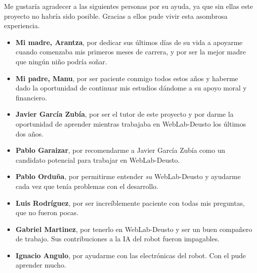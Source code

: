 Me gustaría agradecer a las siguientes personas por su ayuda, ya que sin ellas este proyecto no
habría sido posible. Gracias a ellos pude vivir esta asombrosa experiencia.

\begin{itemize}
	\item \textbf{Mi madre, Arantza}, por dedicar sus últimos días de su vida a apoyarme cuando
	comenzaba mis primeros meses de carrera, y por ser la mejor madre que ningún niño podría soñar.

	\item \textbf{Mi padre, Manu}, por ser paciente conmigo todos estos años y haberme dado la
	oportunidad de continuar mis estudios dándome a su apoyo moral y financiero.

	\item \textbf{Javier García Zubía}, por ser el tutor de este proyecto y por darme la oportunidad
	de aprender mientras trabajaba en WebLab-Deusto los últimos dos años.

	\item \textbf{Pablo Garaizar}, por recomendarme a Javier García Zubía como un candidato
	potencial para trabajar en WebLab-Deusto.

	\item \textbf{Pablo Orduña}, por permitirme entender \textit{su} WebLab-Deusto y ayudarme cada
	vez que tenía problemas con el desarrollo.

	\item \textbf{Luis Rodríguez}, por ser increíblemente paciente con todas mis preguntas, que no
	fueron pocas.

	\item \textbf{Gabriel Martinez}, por tenerlo en WebLab-Deusto y ser un buen compañero de
	trabajo. Sus contribuciones a la IA del robot fueron impagables.

	\item \textbf{Ignacio Angulo}, por ayudarme con las electrónicas del robot. Con el pude aprender
	mucho.
\end{itemize}
